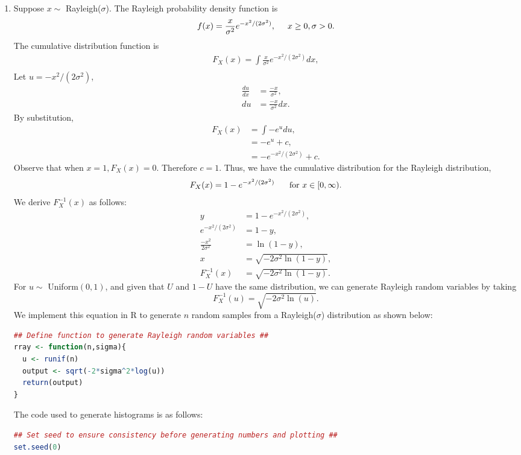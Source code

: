 \documentclass{amsart}
\theoremstyle{definition}
\theoremstyle{remark}
\begin{document}
\begin{enumerate}
\item
Suppose $x \sim$ Rayleigh($\sigma$). The Rayleigh probability density function is
$$ f(x) = \frac{x}{\sigma^2}e^{-x^2/(2\sigma^2)}, \hspace{0.5cm} x \geq 0, \sigma >0.$$
The cumulative distribution function is
\begin{align*}
F_X(x) = \int \frac{x}{\sigma^2}e^{-x^2/(2\sigma^2)} dx,\\
\end{align*}
Let $u = -x^2/(2\sigma^2)$,
\begin{align*}
\frac{du}{dx} &= \frac{-x}{\sigma^2},\\
du &= \frac{-x}{\sigma^2}dx.
\end{align*}
By substitution,
\begin{align*}
F_X(x) &= \int -e^u du,\\
&= -e^u + c,\\
&= -e^{-x^2/(2\sigma^2)} + c.
\end{align*}
Observe that when $x=1, F_X(x)=0$. Therefore $c=1$. Thus, we have the cumulative distribution for the Rayleigh distribution,
$$ F_X(x) = 1 - e^{-x^2/(2\sigma^2)} \hspace{0.5cm} \text{ for } x \in [0,\infty).$$
We derive $F^{-1}_X(x)$ as follows:
\begin{align*}
y &= 1 - e^{-x^2/(2\sigma^2)},\\
e^{-x^2/(2\sigma^2)} &= 1-y,\\
\frac{-x^2}{2\sigma^2} &= \ln (1-y),\\
x &= \sqrt{-2\sigma^2 \ln (1-y)},\\
F^{-1}_X(x) &= \sqrt{-2\sigma^2 \ln (1-y)}.
\end{align*}
For $u \sim$ Uniform$(0,1)$, and given that $U$ and $1-U$ have the same distribution, we can generate Rayleigh random variables by taking
$$ F^{-1}_X(u) = \sqrt{-2\sigma^2 \ln (u)}.$$
We implement this equation in R to generate $n$ random samples from a Rayleigh($\sigma$) distribution as shown below:
\begin{lstlisting}[language=R]
## Define function to generate Rayleigh random variables ##
rray <- function(n,sigma){
  u <- runif(n)
  output <- sqrt(-2*sigma^2*log(u))
  return(output)
}
\end{lstlisting}
The code used to generate histograms is as follows:
\begin{lstlisting}[language=R]
## Set seed to ensure consistency before generating numbers and plotting ##
set.seed(0)


\end{lstlisting}
\end{enumerate}
\end{document}
